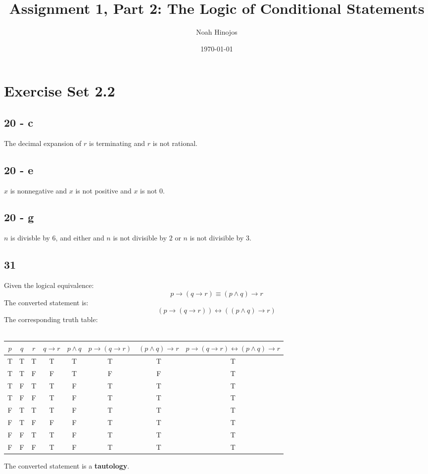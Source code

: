 \documentclass[12pt]{article}
\title{\textbf{Assignment 1, Part 2: The Logic of Conditional Statements}}
\author{Noah Hinojos}
\date{\today}
\begin{document}
\maketitle

\section*{Exercise Set 2.2}

\subsection*{20 - c}
The decimal expansion of $r$ is terminating and $r$ is not rational.

\subsection*{20 - e}
$x$ is nonnegative and $x$ is not positive and $x$ is not 0.

\subsection*{20 - g}
$n$ is divisble by 6, and either and $n$ is not divisible by $2$ or $n$ is not divisible by $3$.

\subsection*{31}
Given the logical equivalence: $$p \rightarrow (q \rightarrow r)\equiv(p \wedge q)\rightarrow r$$
The converted statement is:
$$(p \rightarrow (q \rightarrow r))\leftrightarrow((p \wedge q)\rightarrow r)$$
\newline
The corresponding truth table: \\ \\
\begin{tabular}{c c c|c c|c c|c}
  $p$ & $q$ & $r$ 
  & $q \rightarrow r$ & $p \wedge q$ 
  & $p \rightarrow (q \rightarrow r)$ & $(p \wedge q)\rightarrow r$ 
  & $p \rightarrow (q \rightarrow r)\leftrightarrow (p \wedge q) \rightarrow r$ \\
  \hline
  T&T&T&T&T&T&T&T \\
  T&T&F&F&T&F&F&T \\
  T&F&T&T&F&T&T&T \\
  T&F&F&T&F&T&T&T \\
  F&T&T&T&F&T&T&T \\
  F&T&F&F&F&T&T&T \\
  F&F&T&T&F&T&T&T \\
  F&F&F&T&F&T&T&T \\
\end{tabular}
\newline
\newline
\newline
The converted statement is a \textbf{tautology}.
\end{document}
